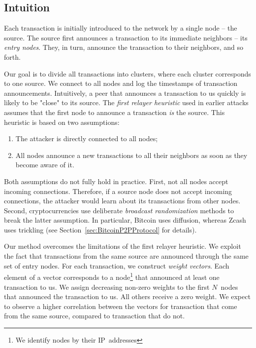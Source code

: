 \subsection{Intuition}

Each transaction is initially introduced to the network by a single node -- the source.
The source first announces a transaction to its immediate neighbors -- its \textit{entry nodes}.
They, in turn, announce the transaction to their neighbors, and so forth.

Our goal is to divide all transactions into clusters, where each cluster corresponds to one source.
We connect to all nodes and log the timestamps of transaction announcements.
Intuitively, a peer that announces a transaction to us quickly is likely to be "close" to its source.
The \textit{first relayer heuristic} used in earlier attacks assumes that the first node to announce a transaction \textit{is} the source.
This heuristic is based on two assumptions:
\begin{enumerate}
	\item The attacker is directly connected to all nodes;
	\item All nodes announce a new transactions to all their neighbors as soon as they become aware of it.
\end{enumerate}
Both assumptions do not fully hold in practice.
First, not all nodes accept incoming connections.
Therefore, if a source node does not accept incoming connections, the attacker would learn about its transactions from other nodes.
Second, cryptocurrencies use deliberate \textit{broadcast randomization} methods to break the latter assumption.
In particular, Bitcoin uses diffusion, whereas Zcash uses trickling (see Section~\ref{sec:BitcoinP2PProtocol} for details).

Our method overcomes the limitations of the first relayer heuristic.
We exploit the fact that transactions from the same source are announced through the same set of entry nodes.
For each transaction, we construct \textit{weight vectors}.
Each element of a vector corresponds to a node\footnote{We identify nodes by their IP~addresses} that announced at least one transaction to us.
We assign decreasing non-zero weights to the first $N$~nodes that announced the transaction to us.
All others receive a zero weight.
We expect to observe a higher correlation between the vectors for transaction that come from the same source, compared to transaction that do not.

